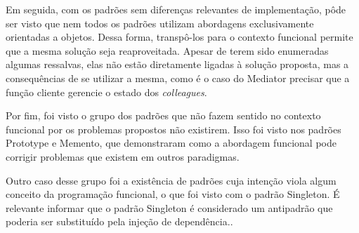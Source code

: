 Em seguida, com os padrões sem diferenças 
relevantes de implementação, pôde ser visto 
que nem todos os padrões utilizam abordagens 
exclusivamente orientadas a objetos. Dessa forma, 
transpô-los para o contexto funcional 
permite que a mesma solução seja reaproveitada. 
Apesar de terem sido enumeradas algumas 
ressalvas, elas não estão diretamente ligadas 
à solução proposta, mas a consequências de 
se utilizar a mesma, como é o caso do Mediator 
precisar que a função cliente gerencie o 
estado dos \textit{colleagues}. 

Por fim, foi visto o grupo dos padrões 
que não fazem sentido no contexto funcional 
por os problemas propostos não existirem. 
Isso foi visto nos padrões Prototype e Memento, 
que demonstraram como a abordagem funcional pode 
corrigir problemas que existem em outros 
paradigmas. 

Outro caso desse grupo foi a existência de 
padrões cuja intenção viola algum conceito da 
programação funcional, o que foi visto 
com o padrão Singleton. É relevante 
informar que o padrão Singleton é considerado 
um antipadrão que poderia ser substituído 
pela injeção de dependência.\cite{singletonantipattern}. 




